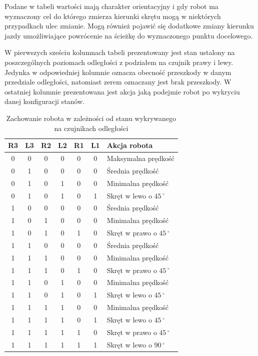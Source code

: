 Podane w tabeli wartości mają charakter orientacyjny i gdy robot ma
wyznaczony cel do którego zmierza kierunki skrętu mogą w niektórych przypadkach
ulec zmianie. Mogą również pojawić się dodatkowe zmiany kierunku jazdy umożliwiające
powrócenie na ścieżkę do wyznaczonego punktu docelowego.

W pierwszych sześciu kolumnach tabeli prezentowany jest stan ustalony na poszczególnych
poziomach odległości z podziałem na czujnik prawy i lewy. Jedynka w odpowiedniej
kolumnie oznacza obecność przeszkody w danym przedziale odległości, natomiast
zerem oznaczany jest brak przeszkody. W ostatniej kolumnie prezentowana jest
akcja jaką podejmie robot po wykryciu danej konfiguracji stanów.

\begin{table}[hb]
\centering
\caption{Zachowanie robota w zależności od stanu wykrywanego na czujnikach odległości}
   	\begin{tabular}{ | c | c | c | c | c | c | p{4.75cm} |} \hline
   		R3 & L3 & R2 & L2 & R1 & L1 & Akcja robota \\ \hline
   		0  & 0  & 0  & 0  & 0  & 0  & Maksymalna prędkość\\ \hline
   		0  & 1  & 0  & 0  & 0  & 0  & Średnia prędkość \\ \hline
   		0  & 1  & 0  & 1  & 0  & 0  & Minimalna prędkość \\ \hline
   		0  & 1  & 0  & 1  & 0  & 1  & Skręt w lewo o $45\,^{\circ}$ \\ \hline 
   		1  & 0  & 0  & 0  & 0  & 0  & Średnia prędkość \\ \hline
   		1  & 0  & 1  & 0  & 0  & 0  & Minimalna prędkość \\ \hline
   		1  & 0  & 1  & 0  & 1  & 0  & Skręt w prawo o $45\,^{\circ}$  \\ \hline
   		1  & 1  & 0  & 0  & 0  & 0  & Średnia prędkość \\ \hline
   		1  & 1  & 1  & 0  & 0  & 0  & Minimalna prędkość \\ \hline
   		1  & 1  & 1  & 0  & 1  & 0  & Skręt w prawo o $45\,^{\circ}$ \\ \hline
   		1  & 1  & 0  & 1  & 0  & 0  & Minimalna prędkość \\ \hline
   		1  & 1  & 0  & 1  & 0  & 1  & Skręt w lewo o $45\,^{\circ}$ \\ \hline 
   		1  & 1  & 1  & 1  & 0  & 0  & Minimalna prędkość \\ \hline 
   		1  & 1  & 1  & 1  & 0  & 1  & Skręt w lewo o $45\,^{\circ}$ \\ \hline 
   		1  & 1  & 1  & 1  & 1  & 0  & Skręt w prawo o $45\,^{\circ}$ \\ \hline 
   		1  & 1  & 1  & 1  & 1  & 1  & Skręt w lewo o $90\,^{\circ}$ \\ \hline
   	\end{tabular}
\label{tab:ObstacleAvoidTable}
\end{table}
\newpage
